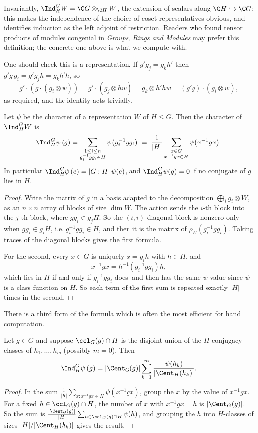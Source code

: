 \begin{remark}
	Invariantly, $\Ind_H^GW = \C G\otimes_{\C H}W$, the extension of scalars along $\C H\hookrightarrow\C G$; this makes the independence of the choice of coset representatives obvious, and identifies induction as the left adjoint of restriction. Readers who found tensor products of modules congenial in \emph{Groups, Rings and Modules} may prefer this definition; the concrete one above is what we compute with.
\end{remark}

One should check this is a representation. If $g' g_j = g_k h'$ then $g'g\,g_i = g'g_jh = g_kh'h$, so
$$g'\cdot(g\cdot(g_i\otimes w)) = g'\cdot (g_j\otimes hw) = g_k\otimes h'hw = (g'g)\cdot(g_i\otimes w),$$
as required, and the identity acts trivially.

\begin{theorem}
	Let $\psi$ be the character of a representation $W$ of $H\leq G$. Then the character of $\Ind_H^GW$ is
	$$\Ind_H^G\psi\,(g) = \sum_{\substack{1\leq i\leq n \\ g_i^{-1}gg_i\in H}}\psi\big(g_i^{-1}gg_i\big) \; = \; \frac1{|H|}\sum_{\substack{x\in G\\ x^{-1}gx\in H}}\psi\big(x^{-1}gx\big).$$
	In particular $\Ind_H^G\psi\,(e) = |G:H|\,\psi(e)$, and $\Ind_H^G\psi(g) = 0$ if no conjugate of $g$ lies in $H$.
\end{theorem}
\begin{proof}
	Write the matrix of $g$ in a basis adapted to the decomposition $\bigoplus_i g_i\otimes W$, as an $n\times n$ array of blocks of size $\dim W$. The action sends the $i$-th block into the $j$-th block, where $gg_i \in g_jH$. So the $(i,i)$ diagonal block is nonzero only when $gg_i\in g_iH$, i.e. $g_i^{-1}gg_i\in H$, and then it is the matrix of $\rho_W(g_i^{-1}gg_i)$. Taking traces of the diagonal blocks gives the first formula.

	For the second, every $x\in G$ is uniquely $x = g_ih$ with $h\in H$, and
	$$x^{-1}gx = h^{-1}(g_i^{-1}gg_i)h,$$
	which lies in $H$ if and only if $g_i^{-1}gg_i$ does, and then has the same $\psi$-value since $\psi$ is a class function on $H$. So each term of the first sum is repeated exactly $|H|$ times in the second.
\end{proof}

There is a third form of the formula which is often the most efficient for hand computation.

\begin{corollary}
	Let $g \in G$ and suppose $\ccl_G(g)\cap H$ is the disjoint union of the $H$-conjugacy classes of $h_1,\dots,h_m$ (possibly $m = 0$). Then
	$$\Ind_H^G\psi\,(g) = |\Cent_G(g)|\sum_{k=1}^m\frac{\psi(h_k)}{|\Cent_H(h_k)|}.$$
\end{corollary}
\begin{proof}
	In the sum $\frac1{|H|}\sum_{x: x^{-1}gx\in H}\psi(x^{-1}gx)$, group the $x$ by the value of $x^{-1}gx$. For a fixed $h\in\ccl_G(g)\cap H$, the number of $x$ with $x^{-1}gx = h$ is $|\Cent_G(g)|$. So the sum is $\frac{|\Cent_G(g)|}{|H|}\sum_{h\in\ccl_G(g)\cap H}\psi(h)$, and grouping the $h$ into $H$-classes of sizes $|H|/|\Cent_H(h_k)|$ gives the result.
\end{proof}

